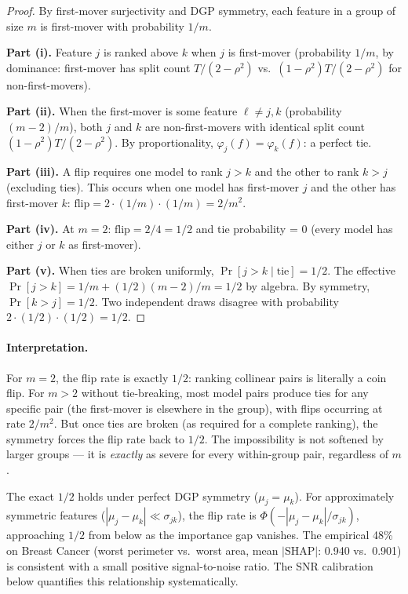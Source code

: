 \documentclass{article}
\begin{document}
\begin{proof}
By first-mover surjectivity and DGP symmetry, each feature in a group
of size $m$ is first-mover with probability $1/m$.

\textbf{Part (i).} Feature $j$ is ranked above $k$ when $j$ is
first-mover (probability $1/m$, by dominance: first-mover has split
count $T/(2-\rho^2)$ vs.\ $(1-\rho^2)T/(2-\rho^2)$ for non-first-movers).

\textbf{Part (ii).} When the first-mover is some feature $\ell \neq j, k$
(probability $(m-2)/m$), both $j$ and $k$ are non-first-movers with
identical split count $(1-\rho^2)T/(2-\rho^2)$. By proportionality,
$\varphi_j(f) = \varphi_k(f)$: a perfect tie.

\textbf{Part (iii).} A flip requires one model to rank $j > k$ and the
other to rank $k > j$ (excluding ties). This occurs when one model has
first-mover $j$ and the other has first-mover $k$:
$\text{flip} = 2 \cdot (1/m) \cdot (1/m) = 2/m^2$.

\textbf{Part (iv).} At $m=2$: $\text{flip} = 2/4 = 1/2$ and tie
probability = $0$ (every model has either $j$ or $k$ as first-mover).

\textbf{Part (v).} When ties are broken uniformly, $\Pr[j > k \mid \text{tie}] = 1/2$.
The effective $\Pr[j > k] = 1/m + (1/2)(m-2)/m = 1/2$ by algebra.
By symmetry, $\Pr[k > j] = 1/2$. Two independent draws disagree with
probability $2 \cdot (1/2) \cdot (1/2) = 1/2$.
\end{proof}

\paragraph{Interpretation.}
For $m = 2$, the flip rate is exactly $1/2$: ranking collinear pairs is
literally a coin flip. For $m > 2$ without tie-breaking, most model pairs
produce ties for any specific pair (the first-mover is elsewhere in the group),
with flips occurring at rate $2/m^2$. But once ties are broken (as required
for a complete ranking), the symmetry forces the flip rate back to $1/2$.
The impossibility is not softened by larger groups --- it is \emph{exactly}
as severe for every within-group pair, regardless of $m$.

The exact $1/2$ holds under perfect DGP symmetry ($\mu_j = \mu_k$).
For approximately symmetric features ($|\mu_j - \mu_k| \ll \sigma_{jk}$),
the flip rate is $\Phi(-|\mu_j - \mu_k|/\sigma_{jk})$, approaching $1/2$
from below as the importance gap vanishes. The empirical 48\% on Breast
Cancer (worst perimeter vs.\ worst area, mean $|\text{SHAP}|$: 0.940 vs.\
0.901) is consistent with a small positive signal-to-noise ratio. The SNR
calibration below quantifies this relationship systematically.
\end{document}
